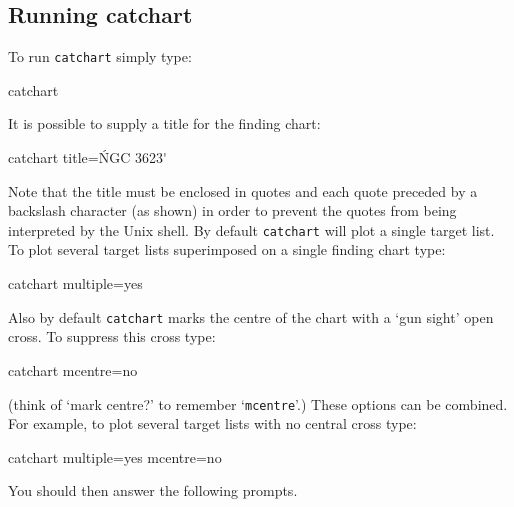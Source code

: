 \documentclass[twoside,11pt]{starlink}
\begin{document}
\subsection{\label{RCATCHART}Running catchart}

To run \texttt{catchart} simply type:

\begin{terminalv}
catchart
\end{terminalv}

It is possible to supply a title for the finding chart:

\begin{terminalv}
catchart  title=\'NGC 3623\'
\end{terminalv}


Note that the title must be enclosed in quotes and each quote preceded
by a backslash character (as shown) in order to prevent the quotes from
being interpreted by the Unix shell.  By default \texttt{catchart} will plot
a single target list.  To plot several target lists superimposed on a
single finding chart type:

\begin{terminalv}
catchart  multiple=yes
\end{terminalv}

Also by default \texttt{catchart} marks the centre of the chart with a `gun
sight' open cross.  To suppress this cross type:

\begin{terminalv}
catchart  mcentre=no
\end{terminalv}

(think of `mark centre?' to remember `\texttt{mcentre}'.)  These options
can be combined.  For example, to plot several target lists with no
central cross type:

\begin{terminalv}
catchart  multiple=yes  mcentre=no
\end{terminalv}

You should then answer the following prompts.
\end{document}
